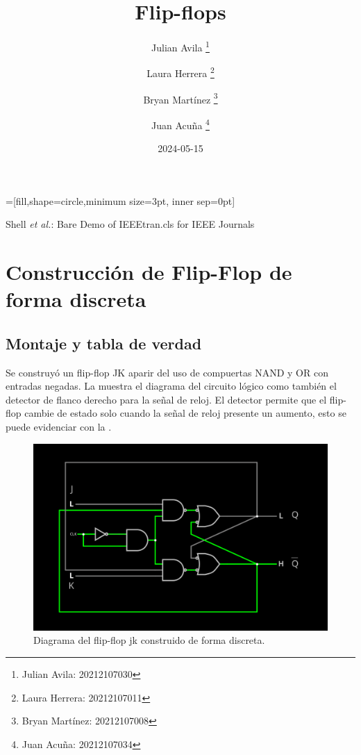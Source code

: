 \documentclass[journal, table]{IEEEtran}
\begin{document}
=[fill,shape=circle,minimum size=3pt, inner sep=0pt]

\title{\textbf{Flip-flops} \\ \small{ }}

\author[*]{Julian Avila
	\thanks{Julian Avila: 20212107030}}
\author[*]{Laura Herrera
	\thanks{Laura Herrera: 20212107011}}
\author[*]{Bryan Martínez
	\thanks{Bryan Martínez: 20212107008}}
\author[*]{Juan Acuña
	\thanks{Juan Acuña: 20212107034}}


\date{2024-05-15}

\markboth{}
{Shell \MakeLowercase{\textit{et al.}}: Bare Demo of IEEEtran.cls for IEEE Journals}

\maketitle

\section{Construcción de Flip-Flop de forma discreta}
\subsection{Montaje y tabla de verdad}
Se construyó un flip-flop JK aparir del uso de compuertas NAND y OR con entradas negadas.
La  muestra el diagrama del circuito lógico como también
el detector de flanco derecho para la señal de reloj.
El detector permite que el flip-flop cambie de estado solo cuando la señal de
reloj presente un aumento, esto se puede evidenciar con la .

\begin{figure}[h!]
	\centering
	\includegraphics[width=0.8\linewidth]{./Discrete-FF/ff-jk-circuit.png}
	\caption{Diagrama del flip-flop jk construido de forma discreta.}
	\label{fig:discrete-jk}
\end{figure}
\end{document}
